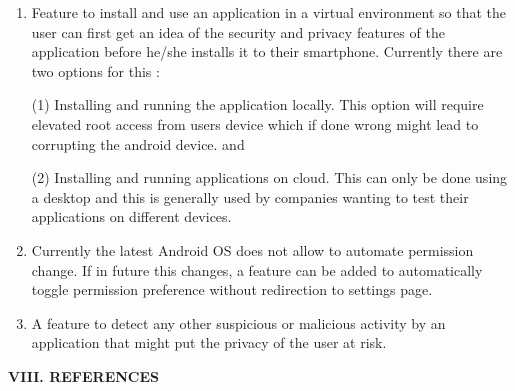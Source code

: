 \documentclass[12pt]{report}
\renewcommand{\_}{\kern-1.5pt\textunderscore\kern-1.5pt}
\begin{document}
\begin{multicols}{2}
\begin{enumerate}
\vspace{\baselineskip}
	\item {\fontsize{10pt}{12.0pt}\selectfont Feature to install and use an application in a virtual environment so that the user can first get an idea of the security and privacy features of the application before he/she installs it to their smartphone. Currently there are two options for this : \par}
\begin{justify}
{\fontsize{10pt}{12.0pt}\selectfont (1) Installing and running the application locally. This option will require elevated root access from users device which if done wrong might lead to corrupting the android device. and\par}
\end{justify}
\begin{justify}
{\fontsize{10pt}{12.0pt}\selectfont (2) Installing and running applications on cloud. This can only be done using a desktop and this is generally used by companies wanting to test their applications on different devices.\par}
\end{justify}

\vspace{\baselineskip}
	\item {\fontsize{10pt}{12.0pt}\selectfont Currently the latest Android OS does not allow to automate permission change. If in future this changes, a feature can be added to automatically toggle permission preference without redirection to settings page.\par}

\vspace{\baselineskip}
	\item {\fontsize{10pt}{12.0pt}\selectfont A feature to detect any other suspicious or malicious activity by an application that might put the privacy of the user at risk.\par}
\end{enumerate}

\vspace{\baselineskip}

\vspace{\baselineskip}

\vspace{\baselineskip}

\vspace{\baselineskip}
\begin{Center}
{\fontsize{10pt}{12.0pt}\selectfont \textbf{VIII. REFERENCES}}
\end{Center}


\end{multicols}
\end{document}
